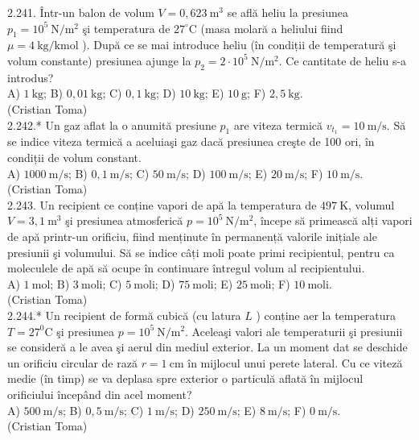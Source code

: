 \documentclass[10pt]{article}
\begin{document}
2.241. Într-un balon de volum $V=0,623 \mathrm{~m}^{3}$ se află heliu la presiunea $p_{1}=10^{5} \mathrm{~N} / \mathrm{m}^{2}$ şi temperatura de $27^{\circ} \mathrm{C}$ (masa molară a heliului fiind $\mu=4 \mathrm{~kg} / \mathrm{kmol}$ ). După ce se mai introduce heliu (în condiții de temperatură şi volum constante) presiunea ajunge la $p_{2}=2 \cdot 10^{5} \mathrm{~N} / \mathrm{m}^{2}$. Ce cantitate de heliu s-a introdus?\\ A) $1 \mathrm{~kg}$; B) $0,01 \mathrm{~kg}$; C) $0,1 \mathrm{~kg}$; D) $10 \mathrm{~kg}$; E) $10 \mathrm{~g}$; F) $2,5 \mathrm{~kg}$.\\ (Cristian Toma)\\

2.242.* Un gaz aflat la o anumită presiune $p_{1}$ are viteza termică $v_{t_{1}}=10 \mathrm{~m} / \mathrm{s}$. Să se indice viteza termică a aceluiaşi gaz dacă presiunea creşte de 100 ori, în condiții de volum constant.\\ A) $1000 \mathrm{~m} / \mathrm{s}$; B) $0,1 \mathrm{~m} / \mathrm{s}$; C) $50 \mathrm{~m} / \mathrm{s}$; D) $100 \mathrm{~m} / \mathrm{s}$; E) $20 \mathrm{~m} / \mathrm{s}$; F) $10 \mathrm{~m} / \mathrm{s}$.\\ (Cristian Toma)\\

2.243. Un recipient ce conține vapori de apă la temperatura de $497 \mathrm{~K}$, volumul $V=3,1 \mathrm{~m}^{3}$ şi presiunea atmosferică $p=10^{5} \mathrm{~N} / \mathrm{m}^{2}$, începe să primească alți vapori de apă printr-un orificiu, fiind menținute în permanență valorile inițiale ale presiunii şi volumului. Să se indice câți moli poate primi recipientul, pentru ca moleculele de apă să ocupe în continuare întregul volum al recipientului.\\ A) $1 \mathrm{~mol}$; B) $3 \mathrm{~moli}$; C) $5 \mathrm{~moli}$; D) $75 \mathrm{~moli}$; E) $25 \mathrm{~moli}$; F) $10 \mathrm{~moli}$.\\ (Cristian Toma)\\

2.244.* Un recipient de formă cubică (cu latura $L$ ) conține aer la temperatura $T=27^{0} \mathrm{C}$ şi presiunea $p=10^{5} \mathrm{~N} / \mathrm{m}^{2}$. Aceleaşi valori ale temperaturii şi presiunii se consideră a le avea şi aerul din mediul exterior. La un moment dat se deschide un orificiu circular de rază $r=1 \mathrm{~cm}$ în mijlocul unui perete lateral. Cu ce viteză medie (în timp) se va deplasa spre exterior o particulă aflată în mijlocul orificiului începând din acel moment?\\ A) $500 \mathrm{~m} / \mathrm{s}$; B) $0,5 \mathrm{~m} / \mathrm{s}$; C) $1 \mathrm{~m} / \mathrm{s}$; D) $250 \mathrm{~m} / \mathrm{s}$; E) $8 \mathrm{~m} / \mathrm{s}$; F) $0 \mathrm{~m} / \mathrm{s}$.\\ (Cristian Toma)\\
\end{document}
